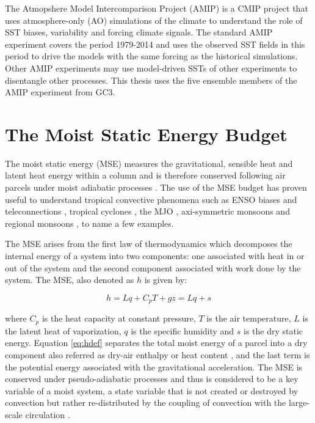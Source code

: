 The Atmopshere Model Intercomparison Project (AMIP) is a CMIP project that uses atmosphere-only (AO) simulations of the climate to understand the role of SST biases, variability and forcing climate signals. The standard AMIP experiment covers the period 1979-2014 and uses the observed SST fields in this period to drive the models with the same forcing as the historical simulations. Other AMIP experiments may use model-driven SSTs of other experiments to disentangle other processes.  This thesis uses the five ensemble members of the AMIP experiment from GC3. 



\section{The Moist Static Energy Budget}\label{sq:msemethod}

The moist static energy (MSE) measures the gravitational, sensible heat and latent heat energy within a column and is therefore conserved following air parcels under moist adiabatic processes \citep{neelin2005,back2006,ma2019}. The use of the MSE budget has proven useful to understand tropical convective phenomena such as ENSO biases \citep{annamalai2020} and teleconnections \citep{neelin2005}, tropical cyclones \citep[e.g.][]{wing2019}, the MJO \citep{inoue2015}, axi-symmetric monsoons \citep[e.g.][]{bordoni2008monsoons} and regional monsoons \citep[e.g.][]{smyth2018simulated,ma2019}, to name a few examples. 

The MSE arises from the first law of thermodynamics which decomposes the internal energy of a system into two components: one associated with heat in or out of the system and the second component associated with work done by the system. 
The MSE, also denoted as $h$ is given by:

\begin{equation}
h=Lq+C_pT+gz=Lq+s
\label{eq:hdef}
\end{equation}

\noindent where $C_p$ is the heat capacity at constant pressure, $T$ is the air temperature, $L$ is the latent heat of vaporization, $q$ is the specific humidity and $s$ is the dry static energy. 
Equation \ref{eq:hdef} separates the total moist energy of a parcel into a dry component also referred as dry-air enthalpy or heat content \citep{emanuel2007quasi}, and the last term is the potential energy associated with the gravitational acceleration. 
The MSE is conserved under pseudo-adiabatic processes and thus is considered to be a key variable of a moist system, a state variable that is not created or destroyed by convection but rather re-distributed by the coupling of convection with the large-scale circulation \citep{chou2004,emanuel2007quasi}.

